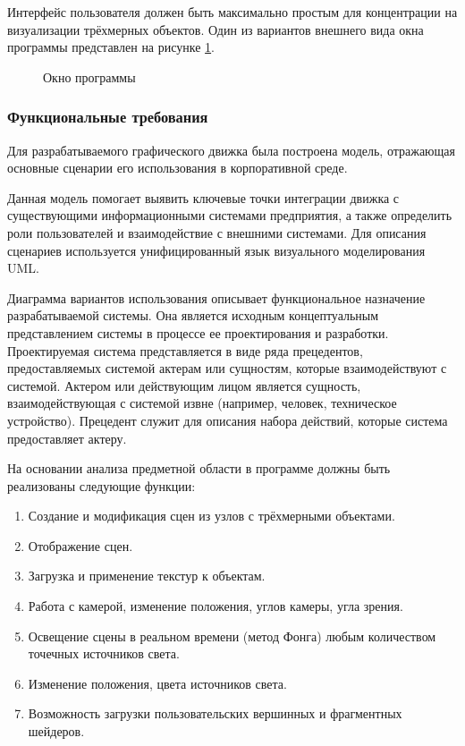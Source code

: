 Интерфейс пользователя должен быть максимально простым для концентрации на визуализации трёхмерных объектов. Один из вариантов внешнего вида окна программы представлен на рисунке \ref{interface:image}.

\begin{figure}[ht]
\caption{Окно программы}
\label{interface:image}
\end{figure}

\subsubsection{Функциональные требования}

Для разрабатываемого графического движка была построена модель, отражающая основные сценарии его использования в корпоративной среде.

Данная модель помогает выявить ключевые точки интеграции движка с существующими информационными системами предприятия, а также определить роли пользователей и взаимодействие с внешними системами. Для описания сценариев используется унифицированный язык визуального моделирования UML.

Диаграмма вариантов использования описывает функциональное назначение разрабатываемой системы. Она является исходным концептуальным представлением системы в процессе ее проектирования и разработки. Проектируемая система представляется в виде ряда прецедентов, предоставляемых системой актерам или сущностям, которые взаимодействуют с системой. Актером или действующим лицом является сущность, взаимодействующая с системой извне (например, человек, техническое устройство). Прецедент служит для описания набора действий, которые система предоставляет актеру.

На основании анализа предметной области в программе должны быть реализованы следующие функции:

\begin{enumerate}
    \item Создание и модификация сцен из узлов с трёхмерными объектами.
    \item Отображение сцен.
    \item Загрузка и применение текстур к объектам.
    \item Работа с камерой, изменение положения, углов камеры, угла зрения.
    \item Освещение сцены в реальном времени (метод Фонга) любым количеством точечных источников света.
    \item Изменение положения, цвета источников света.
    \item Возможность загрузки пользовательских вершинных и фрагментных шейдеров.
\end{enumerate}

